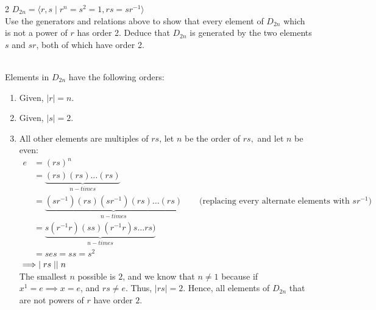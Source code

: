 \documentclass[12pt]{article}
\begin{document}
\newpage
\begin{problem}{2}
        $D_{2n} = \langle r, s \mid r^n =s^2 =1, rs = sr^{-1} \rangle$ \\
    Use the generators and relations above to show that every element of $D_{2n}$ which is not a power of $r$ has order 2. Deduce that $D_{2n}$ is generated by the two elements $s$ and $sr$, both of which have order 2. 
\end{problem}

\begin{solution}
\bbni \\
    Elements in $D_{2n}$ have the following orders: 
    \begin{enumerate}
        \item Given, $\mid r \mid = n$. \\
        \item Given, $\mid s \mid = 2$. \\
        \item All other elements are multiples of $rs$, let $n$ be the order of $rs,$ and let $n$ be even: \\
        \begin{align*}
            e  &= (rs)^n\\  
            &= \underbrace{(rs)(rs)\ldots(rs)}_{n-times} \\ 
            &= \underbrace{(sr^{-1})(rs)(sr^{-1})(rs) \ldots (rs)}_{n-times} \qquad \text{(replacing every alternate elements with $sr^{-1}$}) \\
            &= \underbrace{s(r^{-1}r)(ss)(r^{-1}r)s \ldots rs)}_{n-times} \\
            &= ses = ss = s^2 
        \end{align*} 
        $\implies \mid rs \mid \large\mid n$ \\
        The smallest $n$ possible is $2$, and we know that $n \neq 1$ because if $x^1 = e \implies x = e$, and $rs \neq e$. Thus, $\mid rs \mid = 2$. 
        Hence, all elements of $D_{2n}$ that are not powers of $r$ have  order $2$.
    \end{enumerate}

        \bbni 


\end{solution}
\end{document}
